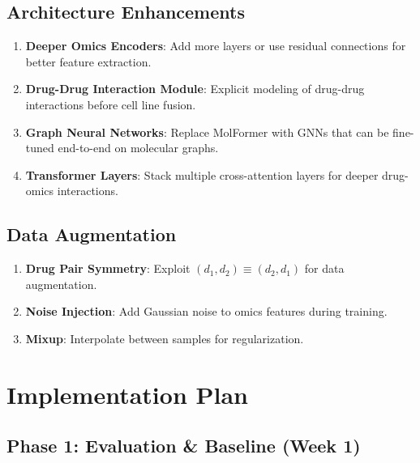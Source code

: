 \documentclass[10pt,twocolumn]{article}
\begin{document}
\subsection{Architecture Enhancements}

\begin{enumerate}
    \item \textbf{Deeper Omics Encoders}: Add more layers or use residual connections for better feature extraction.
    
    \item \textbf{Drug-Drug Interaction Module}: Explicit modeling of drug-drug interactions before cell line fusion.
    
    \item \textbf{Graph Neural Networks}: Replace MolFormer with GNNs that can be fine-tuned end-to-end on molecular graphs.
    
    \item \textbf{Transformer Layers}: Stack multiple cross-attention layers for deeper drug-omics interactions.
\end{enumerate}

\subsection{Data Augmentation}

\begin{enumerate}
    \item \textbf{Drug Pair Symmetry}: Exploit $(d_1, d_2) \equiv (d_2, d_1)$ for data augmentation.
    
    \item \textbf{Noise Injection}: Add Gaussian noise to omics features during training.
    
    \item \textbf{Mixup}: Interpolate between samples for regularization.
\end{enumerate}

\section{Implementation Plan}

\subsection{Phase 1: Evaluation \& Baseline (Week 1)}
\end{document}
